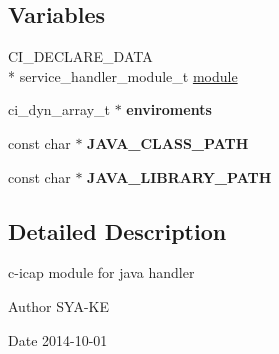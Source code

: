 \subsection*{Variables}
\begin{DoxyCompactItemize}
\item 
C\+I\+\_\+\+D\+E\+C\+L\+A\+R\+E\+\_\+\+D\+A\+T\+A \\*
service\+\_\+handler\+\_\+module\+\_\+t \hyperlink{c-icap-java_8c_a13726af7b2896986044c777506196c76}{module}
\item 
\hypertarget{c-icap-java_8c_ab5569ffeead7850d0eb4861e65a43f54}{ci\+\_\+dyn\+\_\+array\+\_\+t $\ast$ {\bfseries enviroments}}\label{c-icap-java_8c_ab5569ffeead7850d0eb4861e65a43f54}

\item 
\hypertarget{c-icap-java_8c_a52501e8a8e2d6e6cc9757f3878aaefaf}{const char $\ast$ {\bfseries J\+A\+V\+A\+\_\+\+C\+L\+A\+S\+S\+\_\+\+P\+A\+T\+H}}\label{c-icap-java_8c_a52501e8a8e2d6e6cc9757f3878aaefaf}

\item 
\hypertarget{c-icap-java_8c_aeb500a8d91ef3c7b5efb07f3d7f02b7f}{const char $\ast$ {\bfseries J\+A\+V\+A\+\_\+\+L\+I\+B\+R\+A\+R\+Y\+\_\+\+P\+A\+T\+H}}\label{c-icap-java_8c_aeb500a8d91ef3c7b5efb07f3d7f02b7f}

\end{DoxyCompactItemize}


\subsection{Detailed Description}
c-\/icap module for java handler 

\begin{DoxyAuthor}{Author}
S\+Y\+A-\/\+K\+E 
\end{DoxyAuthor}
\begin{DoxyDate}{Date}
2014-\/10-\/01 
\end{DoxyDate}


